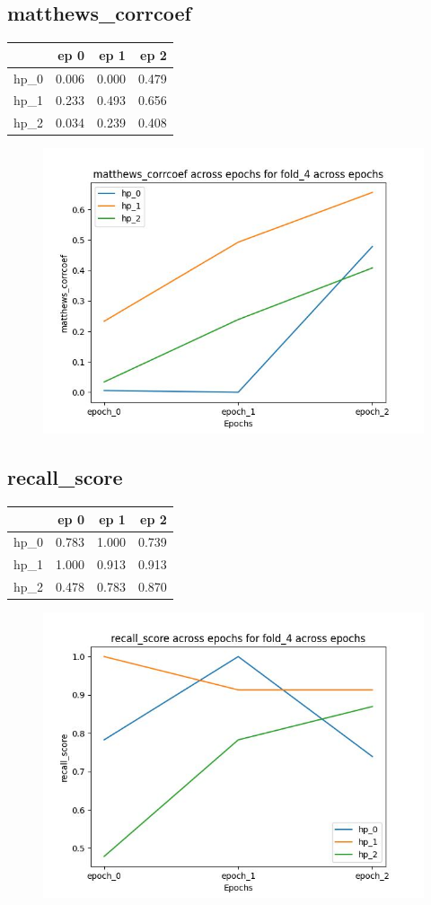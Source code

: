 \documentclass{article}
\begin{document}
\subsection{matthews\_corrcoef}
\begin{tabular}{lrrr}
\toprule
{} &   ep 0 &   ep 1 &   ep 2 \\
\midrule
hp\_0 &  0.006 &  0.000 &  0.479 \\
hp\_1 &  0.233 &  0.493 &  0.656 \\
hp\_2 &  0.034 &  0.239 &  0.408 \\
\bottomrule
\end{tabular}

\begin{figure}[H]
\includegraphics[scale = 0.75]{fold_4/matthews_corrcoef}
\end{figure}
\subsection{recall\_score}
\begin{tabular}{lrrr}
\toprule
{} &   ep 0 &   ep 1 &   ep 2 \\
\midrule
hp\_0 &  0.783 &  1.000 &  0.739 \\
hp\_1 &  1.000 &  0.913 &  0.913 \\
hp\_2 &  0.478 &  0.783 &  0.870 \\
\bottomrule
\end{tabular}

\begin{figure}[H]
\includegraphics[scale = 0.75]{fold_4/recall_score}
\end{figure}
\end{document}
